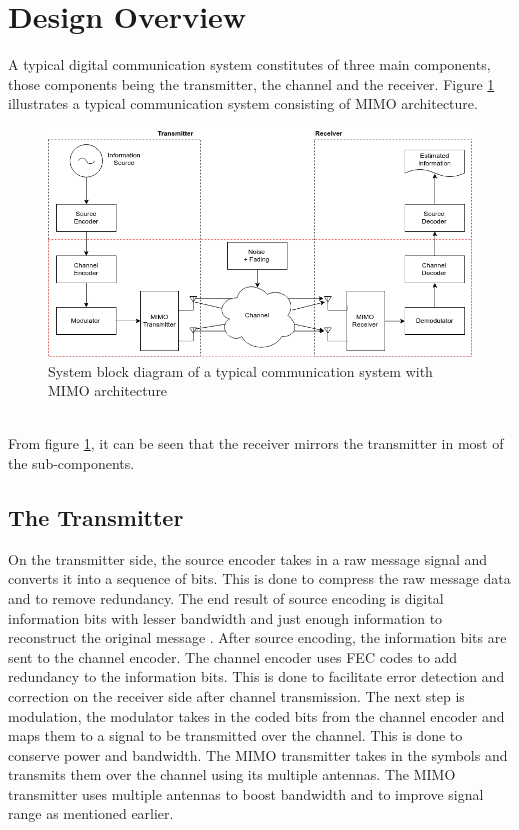 \documentclass[11pt]{report}
\begin{document}
\section{Design Overview}
A typical digital communication system constitutes of three main components, those components being the transmitter, the channel and the receiver. Figure \ref{fig:sys} illustrates a typical communication system consisting of MIMO architecture. 
\\
\begin{figure}[h]
	\centering
	\includegraphics[width=\textwidth]{resources/systemDiagram.png}
	\caption{System block diagram of a typical communication system with MIMO architecture}
	\label{fig:sys}
\end{figure}{}
\\
From figure \ref{fig:sys}, it can be seen that the receiver mirrors the transmitter in most of the sub-components. 

\subsection{The Transmitter}
\label{sub:trans}

On the transmitter side, the source encoder takes in a raw message signal and converts it into a sequence of bits. This is done to compress the raw message data and to remove redundancy. The end result of source encoding is digital information bits with lesser bandwidth and just enough information to reconstruct the original message \cite{B10}. After source encoding, the information bits are sent to the channel encoder. The channel encoder uses FEC codes to add redundancy to the information bits. This is done to facilitate error detection and correction on the receiver side after channel transmission. The next step is modulation, the modulator takes in the coded bits from the channel encoder and maps them to a signal to be transmitted over the channel. This is done to conserve power and bandwidth. The MIMO transmitter takes in the symbols and transmits them over the channel using its multiple antennas. The MIMO transmitter uses multiple antennas to boost bandwidth and to improve signal range as mentioned earlier.
\end{document}
